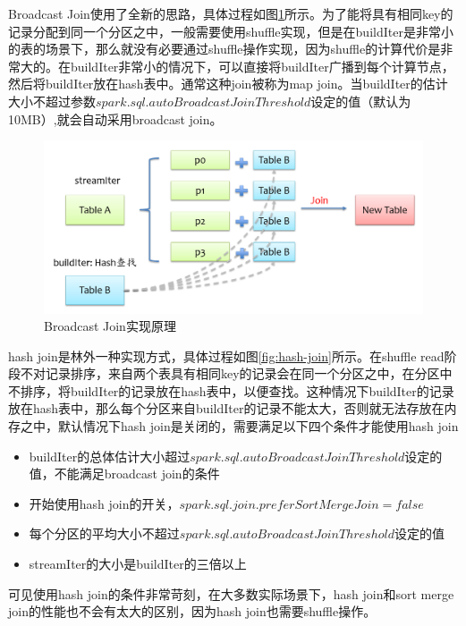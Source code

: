 Broadcast Join使用了全新的思路，具体过程如图\ref{fig:broadcast-join}所示。为了能将具有相同key的记录分配到同一个分区之中，一般需要使用shuffle实现，但是在buildIter是非常小的表的场景下，那么就没有必要通过shuffle操作实现，因为shuffle的计算代价是非常大的。在buildIter非常小的情况下，可以直接将buildIter广播到每个计算节点，然后将buildIter放在hash表中。通常这种join被称为map join。当buildIter的估计大小不超过参数$spark.sql.autoBroadcastJoinThreshold$设定的值（默认为10MB）,就会自动采用broadcast join。


\begin{figure}[htbp]
    \centering
    \includegraphics[width=1\textwidth]{Img/spark-sql-broadcast-join.png}
    \caption{Broadcast Join实现原理}
    \label{fig:broadcast-join}
\end{figure}

hash join是林外一种实现方式，具体过程如图\ref{fig:hash-join}所示。在shuffle read阶段不对记录排序，来自两个表具有相同key的记录会在同一个分区之中，在分区中不排序，将buildIter的记录放在hash表中，以便查找。这种情况下buildIter的记录放在hash表中，那么每个分区来自buildIter的记录不能太大，否则就无法存放在内存之中，默认情况下hash join是关闭的，需要满足以下四个条件才能使用hash join

\begin{itemize}
    \item buildIter的总体估计大小超过$spark.sql.autoBroadcastJoinThreshold$设定的值，不能满足broadcast join的条件
    \item 开始使用hash join的开关，$spark.sql.join.preferSortMergeJoin=false$
    \item 每个分区的平均大小不超过$spark.sql.autoBroadcastJoinThreshold$设定的值
    \item streamIter的大小是buildIter的三倍以上
\end{itemize}

可见使用hash join的条件非常苛刻，在大多数实际场景下，hash join和sort merge join的性能也不会有太大的区别，因为hash join也需要shuffle操作。

